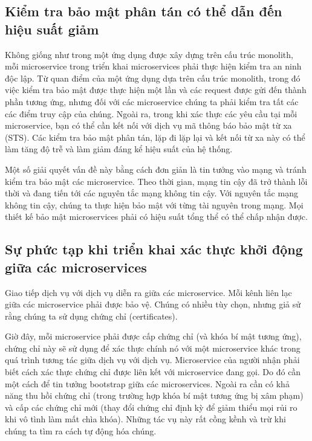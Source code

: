 \documentclass[12pt,a4paper]{report}
\begin{document}
			\subsection{Kiểm tra bảo mật phân tán có thể dẫn đến hiệu suất giảm}
				{\hspace{0.6cm}Không giống như trong một ứng dụng được xây dựng trên cấu trúc monolith, mỗi microservice trong triển khai microservices phải thực hiện kiểm tra an ninh độc lập. Từ quan điểm của một ứng dụng dựa trên cấu trúc monolith, trong đó việc kiểm tra bảo mật được thực hiện một lần và các request được gửi đến thành phần tương ứng, nhưng đối với các microservice chúng ta phải kiểm tra tất các các điểm truy cập của chúng. Ngoài ra, trong khi xác thực các yêu cầu tại mỗi microservice, bạn có thể cần kết nối với dịch vụ mã thông báo bảo mật từ xa (STS). Các kiểm tra bảo mật phân tán, lặp đi lặp lại và kết nối từ xa này có thể làm tăng độ trễ và làm giảm đáng kể hiệu suất của hệ thống.\\}
				
				Một số giải quyết vấn đề này bằng cách đơn giản là tin tưởng vào mạng và tránh kiểm tra bảo mật các microservice. Theo thời gian, mạng tin cậy đã trở thành lỗi thời và đang tiến tới các nguyên tắc mạng không tin cậy. Với nguyên tắc mạng không tin cậy, chúng ta thực hiện bảo mật với từng tài nguyên trong mạng. Mọi thiết kế bảo mật microservices phải có hiệu suất tổng thể có thể chấp nhận được.
			\subsection{Sự phức tạp khi triển khai xác thực khởi động giữa các	microservices}
				{\hspace{0.6cm}Giao tiếp dịch vụ với dịch vụ diễn ra giữa các microservice. Mỗi kênh liên lạc giữa các microservice phải được bảo vệ. Chúng có nhiều tùy chọn, nhưng giả sử rằng chúng ta sử dụng chứng chỉ (certificates).\\}
				
				Giờ đây, mỗi microservice phải được cấp chứng chỉ (và khóa bí mật tương ứng), chứng chỉ này sẽ sử dụng để xác thực chính nó với một microservice khác trong quá trình tương tác giữa dịch vụ với dịch vụ. Microservice của người nhận phải biết cách xác thực chứng chỉ được liên kết với microservice đang gọi. Do đó cần một cách để tin tưởng bootstrap giữa các microservices. Ngoài ra cần có khả năng thu hồi chứng chỉ (trong trường hợp khóa bí mật tương ứng bị xâm phạm) và cấp các chứng chỉ mới (thay đổi chứng chỉ định kỳ để giảm thiểu mọi rủi ro khi vô tình làm mất chìa khóa). Những tác vụ này rất cồng kềnh và trừ khi chúng ta tìm ra cách tự động hóa chúng.\\
\end{document}
